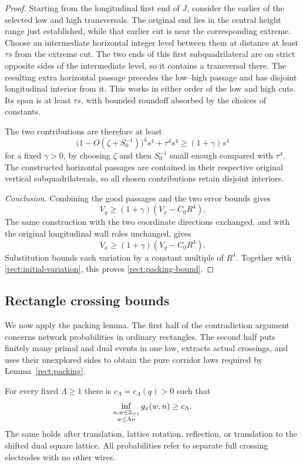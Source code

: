 \begin{proof}
Starting from the longitudinal first end of $J$, consider the earlier
of the selected low and high transversals.  The original end lies in
the central height range just established, while that earlier cut is
near the corresponding extreme.  Choose an intermediate horizontal
integer level between them at distance at least $\tau s$ from the
extreme cut.  The two ends of this first subquadrilateral are on strict
opposite sides of the intermediate level, so it contains a transversal
there.  The resulting extra horizontal passage precedes the low--high
passage and has disjoint longitudinal interior from it.  This works
in either order of the low and high cuts.  Its span is at least
$\tau s$, with bounded roundoff absorbed by the choices of constants.

The two contributions are therefore at least
\[
 \bigl(1-O(\zeta+S_0^{-1})\bigr)^4s^4+\tau^4s^4
 \ge(1+\gamma)s^4
\]
for a fixed $\gamma>0$, by choosing $\zeta$ and then $S_0^{-1}$ small
enough compared with $\tau^4$.  The constructed horizontal passages
are contained in their respective original vertical subquadrilaterals,
so all chosen contributions retain disjoint interiors.

\smallskip\noindent
\emph{Conclusion.}
Combining the good passages and the two error bounds gives
\[
 V_y\ge(1+\gamma)(V_x-C_0R^4).
\]
The same construction with the two coordinate directions exchanged,
and with the original longitudinal wall roles unchanged, gives
\[
 V_x\ge(1+\gamma)(V_y-C_0R^4).
\]
Substitution bounds each variation by a constant multiple of $R^4$.
Together with \eqref{rect:initial-variation}, this proves
\eqref{rect:packing-bound}.
\end{proof}

\subsection{Rectangle crossing bounds}

We now apply the packing lemma. The first half of the contradiction
argument concerns network probabilities in ordinary rectangles. The
second half puts finitely many primal and dual events in one law,
extracts actual crossings, and uses their unexplored sides to obtain
the pure corridor laws required by Lemma~\ref{rect:packing}.

\begin{proposition}
\label{prop:rectangle-rsw}
For every fixed $\Lambda\ge1$ there is $c_\Lambda=c_\Lambda(q)>0$
such that
\begin{equation}
 \inf_{\substack{n,w\in\mathbb Z_{\ge1}\\w\le\Lambda n}}g_x(w,n)
 \ge c_\Lambda.
 \label{rect:rsw}
\end{equation}
The same holds after translation, lattice rotation, reflection, or
translation to the shifted dual square lattice.  All probabilities
refer to separate full crossing electrodes with no other wires.
\end{proposition}

